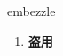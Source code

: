 
\begin{frame}
{\huge embezzle}
\begin{center}
\begin{enumerate}\Large
  \item \textbf{盗用}
\end{enumerate}
\end{center}
\end{frame}
